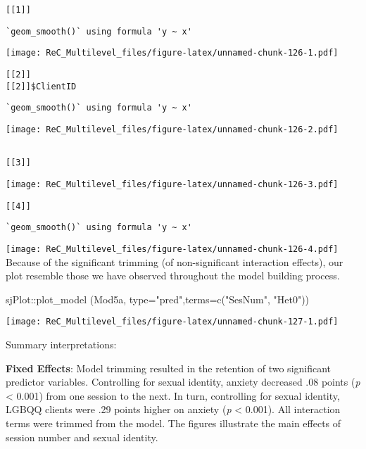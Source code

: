 \documentclass[
  11pt,
]{book}
\newenvironment{Shaded}{\begin{snugshade}}{\end{snugshade}}
\newcommand{\AttributeTok}[1]{\textcolor[rgb]{0.77,0.63,0.00}{#1}}
\newcommand{\FunctionTok}[1]{\textcolor[rgb]{0.00,0.00,0.00}{#1}}
\newcommand{\NormalTok}[1]{#1}
\newcommand{\SpecialCharTok}[1]{\textcolor[rgb]{0.00,0.00,0.00}{#1}}
\newcommand{\StringTok}[1]{\textcolor[rgb]{0.31,0.60,0.02}{#1}}
\begin{document}
\begin{verbatim}
[[1]]
\end{verbatim}

\begin{verbatim}
`geom_smooth()` using formula 'y ~ x'
\end{verbatim}

\texttt{[image: ReC\_Multilevel\_files/figure-latex/unnamed-chunk-126-1.pdf]}

\begin{verbatim}
[[2]]
[[2]]$ClientID
\end{verbatim}

\begin{verbatim}
`geom_smooth()` using formula 'y ~ x'
\end{verbatim}

\texttt{[image: ReC\_Multilevel\_files/figure-latex/unnamed-chunk-126-2.pdf]}

\begin{verbatim}

[[3]]
\end{verbatim}

\texttt{[image: ReC\_Multilevel\_files/figure-latex/unnamed-chunk-126-3.pdf]}

\begin{verbatim}
[[4]]
\end{verbatim}

\begin{verbatim}
`geom_smooth()` using formula 'y ~ x'
\end{verbatim}

\texttt{[image: ReC\_Multilevel\_files/figure-latex/unnamed-chunk-126-4.pdf]}
Because of the significant trimming (of non-significant interaction effects), our plot resemble those we have observed throughout the model building process.

\begin{Shaded}
\begin{Highlighting}[]
\NormalTok{sjPlot}\SpecialCharTok{::}\FunctionTok{plot\_model}\NormalTok{ (Mod5a, }\AttributeTok{type=}\StringTok{"pred"}\NormalTok{,}\AttributeTok{terms=}\FunctionTok{c}\NormalTok{(}\StringTok{"SesNum"}\NormalTok{, }\StringTok{"Het0"}\NormalTok{))}
\end{Highlighting}
\end{Shaded}

\texttt{[image: ReC\_Multilevel\_files/figure-latex/unnamed-chunk-127-1.pdf]}

Summary interpretations:

\textbf{Fixed Effects}: Model trimming resulted in the retention of two significant predictor variables. Controlling for sexual identity, anxiety decreased .08 points (\emph{p} \textless{} 0.001) from one session to the next. In turn, controlling for sexual identity, LGBQQ clients were .29 points higher on anxiety (\emph{p} \textless{} 0.001). All interaction terms were trimmed from the model. The figures illustrate the main effects of session number and sexual identity.
\end{document}
